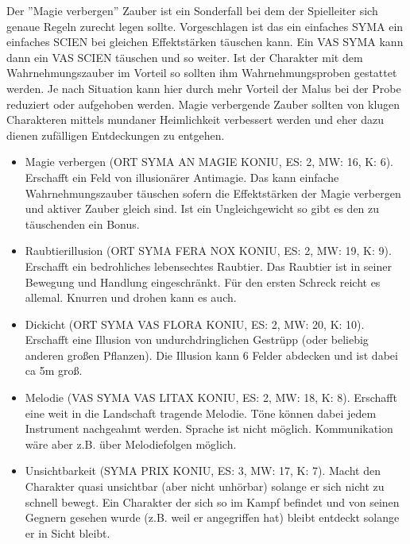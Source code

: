 \documentclass{article}
\begin{document}
Der ''Magie verbergen'' Zauber ist ein Sonderfall bei dem der Spielleiter sich genaue Regeln zurecht legen sollte.
Vorgeschlagen ist das ein einfaches SYMA ein einfaches SCIEN bei gleichen Effektstärken täuschen kann. Ein VAS SYMA
kann dann ein VAS SCIEN täuschen und so weiter. Ist der Charakter mit dem Wahrnehmungszauber im Vorteil so sollten
ihm Wahrnehmungsproben gestattet werden. Je nach Situation kann hier durch mehr Vorteil der Malus bei der Probe
reduziert oder aufgehoben werden. Magie verbergende Zauber sollten von klugen Charakteren mittels mundaner
Heimlichkeit verbessert werden und eher dazu dienen zufälligen Entdeckungen zu entgehen.

\begin{itemize}
\item Magie verbergen (ORT SYMA AN MAGIE KONIU, ES: 2, MW: 16, K: 6). Erschafft ein Feld von illusionärer Antimagie. Das kann einfache Wahrnehmungszauber täuschen sofern die Effektstärken der Magie verbergen und aktiver Zauber gleich sind. Ist ein Ungleichgewicht so gibt es den zu täuschenden ein Bonus.
\end{itemize}

\begin{itemize}
\item Raubtierillusion (ORT SYMA FERA NOX KONIU, ES: 2, MW: 19, K: 9). Erschafft ein bedrohliches lebensechtes Raubtier. Das Raubtier ist in seiner Bewegung und Handlung eingeschränkt. Für den ersten Schreck reicht es allemal. Knurren und drohen kann es auch.
\end{itemize}

\begin{itemize}
\item Dickicht (ORT SYMA VAS FLORA KONIU, ES: 2, MW: 20, K: 10). Erschafft eine Illusion von undurchdringlichen Gestrüpp (oder beliebig anderen großen Pflanzen). Die Illusion kann 6 Felder abdecken und ist dabei ca 5m groß.
\end{itemize}

\begin{itemize}
\item Melodie (VAS SYMA VAS LITAX KONIU, ES: 2, MW: 18, K: 8). Erschafft eine weit in die Landschaft tragende Melodie. Töne können dabei jedem Instrument nachgeahmt werden. Sprache ist nicht möglich. Kommunikation wäre aber z.B. über Melodiefolgen möglich.
\end{itemize}

\begin{itemize}
\item Unsichtbarkeit (SYMA PRIX KONIU, ES: 3, MW: 17, K: 7). Macht den Charakter quasi unsichtbar (aber nicht unhörbar) solange er sich nicht zu schnell bewegt. Ein Charakter der sich so im Kampf befindet und von seinen Gegnern gesehen wurde (z.B. weil er angegriffen hat) bleibt entdeckt solange er in Sicht bleibt.
\end{itemize}
\end{document}
